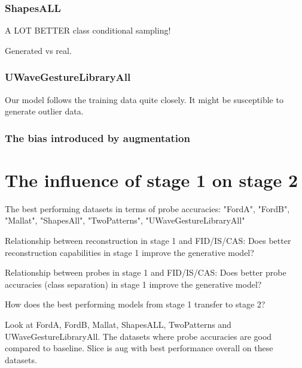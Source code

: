 \documentclass[../../thesis.tex]{subfiles}
\begin{document}
\subsubsection{ShapesALL}
A LOT BETTER class conditional sampling!

Generated vs real.



\subsubsection{UWaveGestureLibraryAll}


Our model follows the training data quite closely. It might be susceptible to generate outlier data.

\subsubsection{The bias introduced by augmentation}






\section{The influence of stage 1 on stage 2}
The best performing datasets in terms of probe accuracies: "FordA", "FordB", "Mallat", "ShapesAll", "TwoPatterns", "UWaveGestureLibraryAll"\newline

Relationship between reconstruction in stage 1 and FID/IS/CAS:
Does better reconstruction capabilities in stage 1 improve the generative model?\newline

Relationship between probes in stage 1 and FID/IS/CAS:
Does better probe accuracies (class separation) in stage 1 improve the generative model?\newline

How does the best performing models from stage 1 transfer to stage 2?\newline

Look at FordA, FordB, Mallat, ShapesALL, TwoPatterns and UWaveGestureLibraryAll. The datasets where probe accuracies are good compared to baseline. Slice is aug with best performance overall on these datasets. \newline
\end{document}

